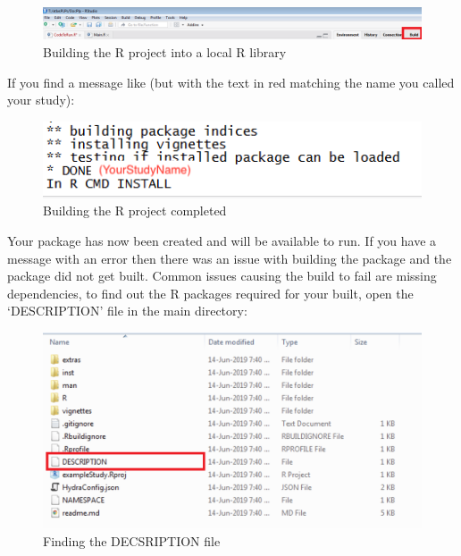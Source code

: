 \documentclass[11pt]{book}
\begin{document}
\begin{figure}
\includegraphics[width=1\linewidth]{images/PatientLevelPrediction/atlasImplementation/building} \caption{Building the R project into a local R library}\label{fig:figureU13}
\end{figure}

If you find a message like (but with the text in red matching the name
you called your study):

\begin{figure}
\includegraphics[width=1\linewidth]{images/PatientLevelPrediction/atlasImplementation/buildComplete} \caption{Building the R project completed}\label{fig:figureU14}
\end{figure}

Your package has now been created and will be available to run. If you
have a message with an error then there was an issue with building the
package and the package did not get built. Common issues causing the
build to fail are missing dependencies, to find out the R packages
required for your built, open the `DESCRIPTION' file in the main
directory:

\begin{figure}
\includegraphics[width=1\linewidth]{images/PatientLevelPrediction/atlasImplementation/download_folder_desc} \caption{Finding the DECSRIPTION file}\label{fig:figureU15}
\end{figure}
\end{document}
